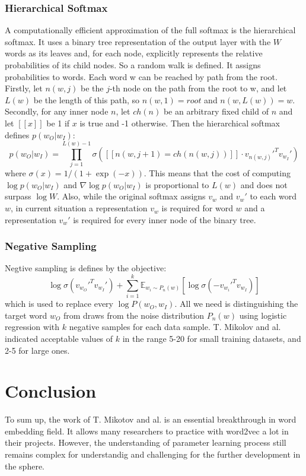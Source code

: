 \documentclass[conference, ]{IEEEtran}
\newcommand{\E}{\mathbb{E}}
\begin{document}
	\subsubsection*{Hierarchical Softmax}
	A computationally efficient approximation of the full softmax is the hierarchical softmax. It uses a binary tree representation of the output layer with the $W$ words as
	its leaves and, for each node, explicitly represents the relative probabilities of its child nodes. So a random walk is defined. It assigns probabilities to words.
	Each word w can be reached by path from the root. Firstly, let
	$n(w, j)$ be the $j$-th node on the path from the root to w, and let $L(w)$ be the length of this path, so
	$n(w, 1) = root$ and $n(w, L(w)) = w$. Secondly, for any inner node $n$, let $ch(n)$ be an arbitrary
	fixed child of $n$ and let $[[x]]$ be 1 if $x$ is true and -1 otherwise. Then the hierarchical softmax defines
	$p(w_O |w_I )$:
	\[
	p(w_O |w_I )=\prod_{j=1}^{L(w)-1}\sigma
	\left(
	[[n(w, j+1)=ch(n(w, j))]]\cdot v_{n(w, j)}'^T
	v_{w_I}'
	\right)
	\]
	where $\sigma(x)=1/(1+\exp(-x))$. This means that the cost of computing $\log p(w_O |w_I )$ and $\nabla \log p(w_O |w_I )$ is proportional to $L(w)$ and does not surpass $\log W$. Also, while the original softmax assigns $v_w$ and $v_w'$ to each word $w$, in current situation a representation $v_w$ is required for word $w$ and a representation $v_w'$ is required for every inner node of the binary tree.\cite{mikolov2}
	
	\subsubsection*{Negative Sampling}
	Negtive sampling is defines by the objective:
	\[
	\log\sigma(v_{w_O}'^T v_{w_I}')+
	\sum_{i=1}^{k}\E_{w_i\sim P_n(w)}\left[
	\log\sigma(-v_{w_i}'^T v_{w_I})
	\right]
	\]
	which is used to replace every $\log P(w_O, w_I)$. All we need is distinguishing the target word $w_O$ from draws from the noise distribution $P_n(w)$ using logistic regression with $k$ negative samples for each data sample. T. Mikolov and al. indicated acceptable  values
	of $k$ in the range 5-20 for small training datasets, and 2-5 for large ones.\cite{mikolov2}
	
	\section*{Conclusion}
	To sum up, the work of T. Mikotov and al. is an essential breakthrough in word embedding field. It allows many researchers to practice with word2vec a lot in their projects. However, the understanding of parameter learning process still remains complex for understandig and challenging for the further development in the sphere.
	
\end{document}
